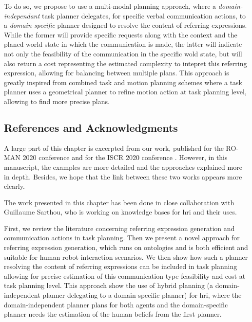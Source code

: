 \documentclass[a4paper,11pt,twoside]{StyleThese}
\begin{document}
To do so, we propose to use a multi-modal planning approach, where a \textit{domain-independant} task planner delegates, for specific verbal communication actions, to a \textit{domain-specific} planner designed to resolve the content of referring expressions. While the former will provide specific requests along with the context and the planed world state in which the communication is made, the latter will indicate not only the feasibility of the communication in the specific wold state, but will also return a cost representing the estimated complexity to intepret this referring expression, allowing for balancing between multiple plans. This approach is greatly inspired from combined task and motion planning schemes \cite{gharbi2015combining} where a task planner uses a geometrical planner to refine motion action at task planning level, allowing to find more precise plans.

\subsection{References and Acknowledgments}
A large part of this chapter is excerpted from our work, published for the RO-MAN 2020 conference \cite{buisan2020efficient} and for the ISCR 2020 conference \cite{buisan2020human}. However, in this manuscript, the examples are more detailed and the approaches explained more in depth. Besides, we hope that the link between these two works appears more clearly.

The work presented in this chapter has been done in close collaboration with Guillaume Sarthou, who is working on knowledge bases for \acrshort{hri} and their uses.

\medskip

First, we review the literature concerning referring expression generation and communication actions in task planning. Then we present a novel approach for referring expression generation, which runs on ontologies and is both efficient and suitable for human robot interaction scenarios. We then show how such a planner resolving the content of referring expressions can be included in task planning allowing for precise estimation of this communication type feasibility and cost at task planning level. This approach show the use of hybrid planning (a domain-independent planner delegating to a domain-specific planner) for \acrshort{hri}, where the domain-independent planner plans for both agents and the domain-specific planner needs the estimation of the human beliefs from the first planner.
\end{document}
